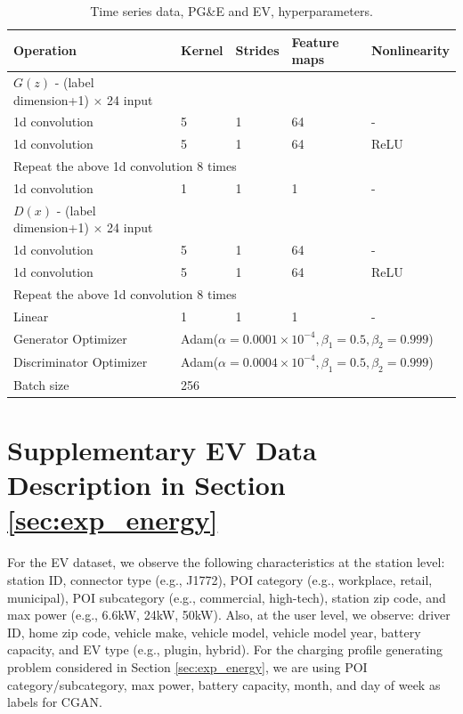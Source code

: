 \documentclass{article}
\begin{document}
\begin{table}[htbp]
\caption{Time series data, PG\&E and EV, hyperparameters. }
\centering
\begin{tabular}{lllll}
\hline 
Operation& Kernel &Strides &Feature maps & Nonlinearity\\
\hline 
$G(z)$ - (label dimension+1) $\times$ 24  input  & & & & \\
1d convolution & 5 & 1 & 64  & -\\
1d convolution & 5 & 1 & 64  & ReLU\\
\multicolumn{5}{l}{Repeat the above 1d convolution 8 times}\\
1d convolution & 1 & 1 & 1  & -\\
$D(x)$ -  (label dimension+1) $\times$ 24  input  & & & & \\
1d convolution & 5 & 1 & 64 &  -\\
1d convolution & 5 & 1 & 64 &  ReLU\\
\multicolumn{5}{l}{Repeat the above 1d convolution 8 times}\\
Linear & 1 & 1 & 1  & -\\
Generator Optimizer &\multicolumn{4}{l}{Adam($\alpha=0.0001\times 10^{-4}, \beta_1=0.5, \beta_2=0.999$)}\\
Discriminator Optimizer &\multicolumn{4}{l}{Adam($\alpha=0.0004\times 10^{-4}, \beta_1=0.5, \beta_2=0.999$)}\\
Batch size &\multicolumn{4}{l}{256}\\
\hline
\end{tabular}
\label{tab:time_series}
\end{table}	
	
\section{Supplementary EV Data Description in Section \ref{sec:exp_energy}}\label{app: data}

For the EV dataset, we observe the following characteristics at the station level: station ID, connector type (e.g., J1772), POI category (e.g., workplace, retail, municipal), 	POI subcategory (e.g., commercial, high-tech), station zip code, and max power (e.g., 6.6kW, 24kW, 50kW). Also, at the user level, we observe: driver ID, home zip code, vehicle make, vehicle model, vehicle model year, battery capacity, and EV type (e.g., plugin, hybrid). For the charging profile generating problem considered in Section \ref{sec:exp_energy}, we are using POI category/subcategory, max power, battery capacity, month, and day of week as labels for CGAN. 
\end{document}
